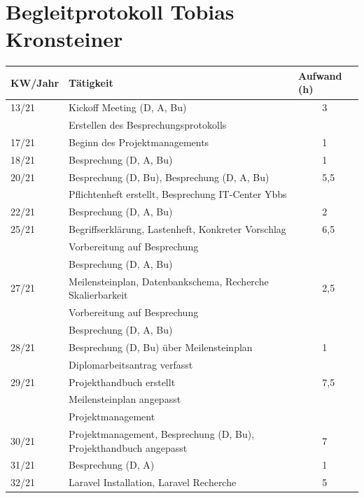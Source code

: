 \section{Begleitprotokoll Tobias Kronsteiner}
\begin{table}[h]
	\begin{tabular}{|l|lll|}
		\hline
		KW/Jahr &
		\multicolumn{1}{l|}{Tätigkeit} &
		\multicolumn{2}{l|}{Aufwand (h)} \\ \hline
		13/21 &
		\multicolumn{2}{l|}{Kickoff Meeting (D, A, Bu) } &
		3 \\  & Erstellen des Besprechungsprotokolls \\ \hline
		17/21 &
		\multicolumn{2}{l|}{Beginn des Projektmanagements} &
		1 \\ \hline
		18/21 &
		\multicolumn{2}{l|}{Besprechung (D, A, Bu)} &
		1 \\ \hline
		20/21 &
		\multicolumn{2}{l|}{Besprechung (D, Bu), Besprechung (D, A, Bu)} &
		5,5 \\ & Pflichtenheft erstellt, Besprechung IT-Center Ybbs\\ \hline
		22/21 &
		\multicolumn{2}{l|}{Besprechung (D, A, Bu) } &
		2 \\ \hline
		25/21 &
		\multicolumn{2}{l|}{Begriffserklärung, Lastenheft, Konkreter Vorschlag } &
		6,5 \\ &Vorbereitung auf Besprechung\\ &Besprechung (D, A, Bu)\\\hline
		27/21 &
		\multicolumn{2}{l|}{Meilensteinplan, Datenbankschema, Recherche Skalierbarkeit} &
		2,5 \\ &Vorbereitung auf Besprechung\\ &Besprechung (D, A, Bu)\\\hline
		28/21 &
		\multicolumn{2}{l|}{Besprechung (D, Bu) über Meilensteinplan} &
		1 \\ &Diplomarbeitsantrag verfasst\\ \hline
		29/21 &
		\multicolumn{2}{l|}{Projekthandbuch erstellt} &
		7,5 \\ &Meilensteinplan angepasst \\ &Projektmanagement\\\hline
		30/21 &
		\multicolumn{2}{l|}{Projektmanagement, Besprechung (D, Bu), Projekthandbuch angepasst} &
		7 \\  \hline
		31/21 &
		\multicolumn{2}{l|}{Besprechung (D, A)} &
		1 \\ \hline
		32/21 &
		\multicolumn{2}{l|}{Laravel Installation, Laravel Recherche} &
		5 \\ \hline

\end{tabular}
\end{table}
